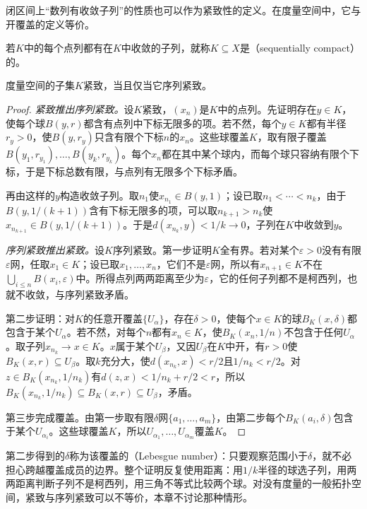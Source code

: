 闭区间上“数列有收敛子列”的性质也可以作为紧致性的定义。在度量空间中，它与开覆盖的定义等价。

\begin{definition}[序列紧致]
\label{def:metric-sequentially-compact}
若$K$中的每个点列都有在$K$中收敛的子列，就称$K\subseteq X$是（sequentially compact）的。
\end{definition}

\begin{theorem}[紧致性的序列刻画]
\label{thm:metric-compact-sequential}
度量空间的子集$K$紧致，当且仅当它序列紧致。
\end{theorem}

\begin{proof}
\emph{紧致推出序列紧致。}设$K$紧致，$(x_n)$是$K$中的点列。先证明存在$y\in K$，使每个球$B(y,r)$都含有点列中下标无限多的项。若不然，每个$y\in K$都有半径$r_y>0$，使$B(y,r_y)$只含有限个下标$n$的$x_n$。这些球覆盖$K$，取有限子覆盖$B(y_1,r_{y_1}),\dots,B(y_k,r_{y_k})$。每个$x_n$都在其中某个球内，而每个球只容纳有限个下标，于是下标总数有限，与点列有无限多个下标矛盾。

再由这样的$y$构造收敛子列。取$n_1$使$x_{n_1}\in B(y,1)$；设已取$n_1<\cdots<n_k$，由于$B(y,1/(k+1))$含有下标无限多的项，可以取$n_{k+1}>n_k$使$x_{n_{k+1}}\in B(y,1/(k+1))$。于是$d(x_{n_k},y)<1/k\to0$，子列在$K$中收敛到$y$。

\emph{序列紧致推出紧致。}设$K$序列紧致。第一步证明$K$全有界。若对某个$\varepsilon>0$没有有限$\varepsilon$网，任取$x_1\in K$；设已取$x_1,\dots,x_n$，它们不是$\varepsilon$网，所以有$x_{n+1}\in K$不在$\bigcup_{i\leq n}B(x_i,\varepsilon)$中。所得点列两两距离至少为$\varepsilon$，它的任何子列都不是柯西列，也就不收敛，与序列紧致矛盾。

第二步证明：对$K$的任意开覆盖$\{U_\alpha\}$，存在$\delta>0$，使每个$x\in K$的球$B_K(x,\delta)$都包含于某个$U_\alpha$。若不然，对每个$n$都有$x_n\in K$，使$B_K(x_n,1/n)$不包含于任何$U_\alpha$。取子列$x_{n_k}\to x\in K$。$x$属于某个$U_\beta$，又因$U_\beta$在$K$中开，有$r>0$使$B_K(x,r)\subseteq U_\beta$。取$k$充分大，使$d(x_{n_k},x)<r/2$且$1/n_k<r/2$。对$z\in B_K(x_{n_k},1/n_k)$有$d(z,x)<1/n_k+r/2<r$，所以$B_K(x_{n_k},1/n_k)\subseteq B_K(x,r)\subseteq U_\beta$，矛盾。

第三步完成覆盖。由第一步取有限$\delta$网$\{a_1,\dots,a_m\}$，由第二步每个$B_K(a_i,\delta)$包含于某个$U_{\alpha_i}$。这些球覆盖$K$，所以$U_{\alpha_1},\dots,U_{\alpha_m}$覆盖$K$。
\end{proof}

第二步得到的$\delta$称为该覆盖的（Lebesgue number）：只要观察范围小于$\delta$，就不必担心跨越覆盖成员的边界。整个证明反复使用距离：用$1/k$半径的球选子列，用两两距离判断子列不是柯西列，用三角不等式比较两个球。对没有度量的一般拓扑空间，紧致与序列紧致可以不等价，本章不讨论那种情形。

